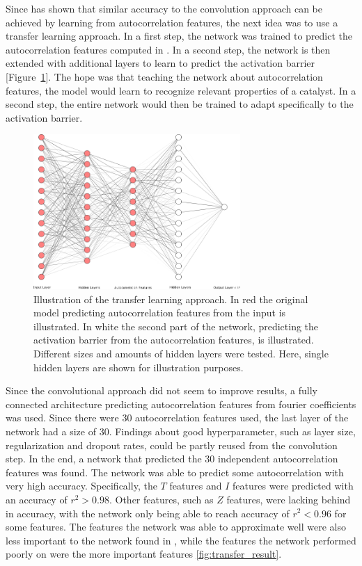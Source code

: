 Since \cite{friederich_dos} has shown that similar accuracy to the convolution approach can be achieved by learning from autocorrelation features,
the next idea was to use a transfer learning approach.
In a first step, the network was trained to predict the autocorrelation features computed in \cite{friederich_dos}.
In a second step, the network is then extended with additional layers to learn to predict the activation barrier [Figure~\ref{fig:transferlearn}].
The hope was that teaching the network about autocorrelation features, the model would learn to recognize relevant properties of a catalyst.
In a second step, the entire network would then be trained to adapt specifically to the activation barrier.

\begin{figure} [h]
    \centering
    \includegraphics[width=0.7\textwidth]{figures/regression/fourier/nn.png} 
    \caption[Transfer learning model]{Illustration of the transfer learning approach.
        In red the original model predicting autocorrelation features from the input is illustrated.
        In white the second part of the network, predicting the activation barrier from the autocorrelation features, is illustrated.
        Different sizes and amounts of hidden layers were tested. Here, single hidden layers are shown for illustration purposes.
    }
    \label{fig:transferlearn}
\end{figure}

Since the convolutional approach did not seem to improve results, a fully connected architecture predicting autocorrelation features from fourier coefficients 
was used.
Since there were 30 autocorrelation features used, the last layer of the network had a size of 30.
Findings about good hyperparameter, such as layer size, regularization and dropout rates, could be partly reused from the convolution step.
In the end, a network that predicted the 30 independent autocorrelation features was found.
The network was able to predict some autocorrelation with very high accuracy. Specifically, the $T$ features and $I$ features were
predicted with an accuracy of $r^2 > 0.98$. 
Other features, such as $Z$ features, were lacking behind in accuracy, with the network only being able to reach accuracy of $r^2<0.96$ for some features.
The features the network was able to approximate well were also less important to the network found in \cite{friederich_dos}, while the features 
the network performed poorly on were the more important features \ref{fig:transfer_result}.

